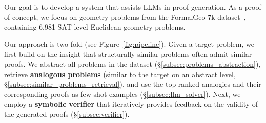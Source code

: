 


Our goal is to develop a system that assists LLMs in proof generation.
As a proof of concept, we focus on geometry problems from the FormalGeo-7k dataset~\cite{zhang2023formalgeo}, containing 6,981 SAT-level Euclidean geometry problems.



Our approach is two-fold (see Figure~\ref{fig:pipeline}). Given a target problem, we first %
build on the insight that structurally similar problems often admit similar proofs. We abstract all problems in the dataset {(\S\ref{subsec:problems_abstraction})}, retrieve {\bf analogous problems} {(similar to the target on an abstract level, \S\ref{subsec:similar_problems_retrieval})}, and use the top-ranked analogies and their corresponding proofs as few-shot examples 
{(\S\ref{subsec:llm_solver})}.
Next, we employ a {\bf symbolic verifier} that iteratively provides feedback on the validity of the generated proofs {(\S\ref{subsec:verifier})}.





